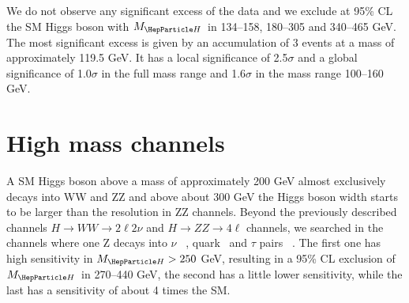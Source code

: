 \documentclass{cimento}
\newcommand{\MH}{\ensuremath{M_{\PH}}}
\begin{document}
We do not observe any significant excess of the data and we exclude at
95\% CL the SM Higgs boson with \MH\ in 134--158, 180--305 and
340--465 GeV.  The most significant excess is given by an accumulation
of 3 events at a mass of approximately 119.5 GeV.  It has a local
significance of 2.5$\sigma$ and a global significance of 1.0$\sigma$
in the full mass range and 1.6$\sigma$ in the mass range 100--160 GeV.








\section{High mass channels}

A SM Higgs boson above a mass of approximately 200 GeV almost
exclusively decays into WW and ZZ and above about 300 GeV the Higgs
boson width starts to be larger than the resolution in ZZ channels.
Beyond the previously described channels $H \to WW \to 2\ell 2\nu$ and
$H \to ZZ \to 4\ell$ channels, we searched in the channels where one Z
decays into $\nu$ ~\cite{Chatrchyan:2012ft},
quark~\cite{Chatrchyan:2012sn} and $\tau$ pairs
~\cite{Chatrchyan:2012hr}.  The first one has high sensitivity in
$\MH>250$ GeV, resulting in a 95\% CL exclusion of \MH\ in 270--440
GeV, the second has a little lower sensitivity, while the last has a
sensitivity of about 4 times the SM.


\end{document}
